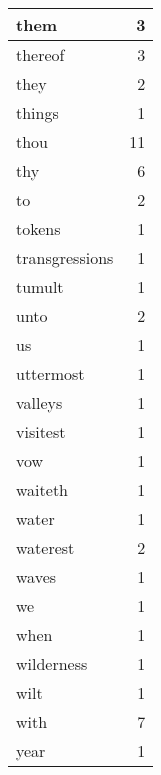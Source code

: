 \begin{center}
\begin{longtable}{l|r}
them & 3 \\ \hline
thereof & 3 \\ \hline
they & 2 \\ \hline
things & 1 \\ \hline
thou & 11 \\ \hline
thy & 6 \\ \hline
to & 2 \\ \hline
tokens & 1 \\ \hline
transgressions & 1 \\ \hline
tumult & 1 \\ \hline
unto & 2 \\ \hline
us & 1 \\ \hline
uttermost & 1 \\ \hline
valleys & 1 \\ \hline
visitest & 1 \\ \hline
vow & 1 \\ \hline
waiteth & 1 \\ \hline
water & 1 \\ \hline
waterest & 2 \\ \hline
waves & 1 \\ \hline
we & 1 \\ \hline
when & 1 \\ \hline
wilderness & 1 \\ \hline
wilt & 1 \\ \hline
with & 7 \\ \hline
year & 1 \\ \hline
\end{longtable}
\end{center}



\normalsize



